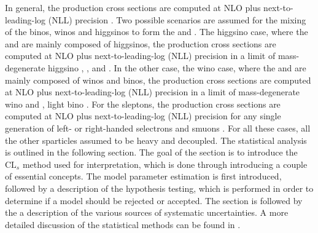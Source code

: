 In general, the production cross sections are computed at NLO plus next-to-leading-log (NLL) precision \cite{Kulesza:2008jb, Kulesza:2009kq,Borschensky:2014cia}.
Two possible scenarios are assumed for the mixing of the binos, winos and higgsinos to form the \firstcharg and \secondchi. 
The higgsino case, where the \firstcharg and \secondchi are mainly composed of higgsinos, the production cross sections are computed at NLO plus next-to-leading-log (NLL) precision in a limit of mass-degenerate higgsino \firstcharg, \secondchi, and \firstchi \cite{Beenakker:1999xh,Fuks:2012qx, Fuks:2013vua}. 
In the other case, the wino case, where the \firstcharg and \secondchi are mainly composed of winos and binos, the production cross sections are computed at NLO plus next-to-leading-log (NLL) precision in a limit of mass-degenerate wino \secondchi and \firstcharg, light bino \firstchi \cite{Beenakker:1999xh, Fuks:2012qx, Fuks:2013vua}. 
For the sleptons, the production cross sections are computed at NLO plus next-to-leading-log (NLL) precision for any single generation of left- or right-handed selectrons and smuons \cite{Beenakker:1999xh, Fuks:2013lya}. 
For all these cases, all the other sparticles assumed to be heavy and decoupled.
The statistical analysis is outlined in the following section. 
The goal of the section is to introduce the $\mathrm{CL}_{s}$ method used for interpretation, which is done through introducing a couple of essential concepts. 
The model parameter estimation is first introduced, followed by a description of the hypothesis testing, which is performed in order to determine if a model should be rejected or accepted.
The section is followed by the a description of the various sources of systematic uncertainties. 
A more detailed discussion of the statistical methods can be found in \cite{Lista:2016chp}. 
